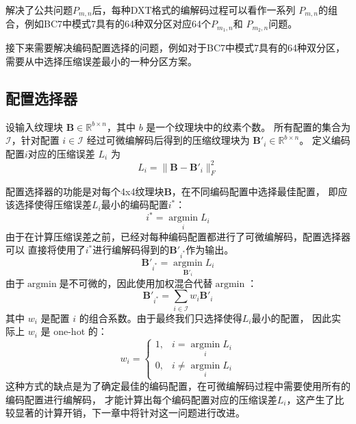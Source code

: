 解决了公共问题$P_{m,n}$后，每种DXT格式的编解码过程可以看作一系列
$P_{m,n}$的组合，例如BC7中模式7具有的64种双分区对应64个$P_{m_1,n}$和
$P_{m_2,n}$问题。

接下来需要解决编码配置选择的问题，例如对于BC7中模式7具有的64种双分区，
需要从中选择压缩误差最小的一种分区方案。

\subsection{配置选择器}

设输入纹理块 $\mathbf{B}\in\mathbb{R}^{b\times n}$，其中 $b$ 是一个纹理块中的纹素个数。
所有配置的集合为 $\mathcal{I}$，针对配置 $i\in\mathcal{I}$ 经过可微编解码后得到的压缩纹理块为 $\mathbf{B}'_i\in\mathbb{R}^{b\times n}$。
定义编码配置$i$对应的压缩误差 $L_i$ 为
\begin{equation}
L_i=\|\mathbf{B}-\mathbf{B}'_i\|_F^2
\end{equation}

配置选择器的功能是对每个4x4纹理块$\mathbf{B}$，在不同编码配置中选择最佳配置，
即应该选择使得压缩误差$L_i$最小的编码配置$i^*$：
\begin{equation}
    i^*=\mathop{\arg\min}\limits_{i} L_i
\end{equation}
由于在计算压缩误差之前，已经对每种编码配置都进行了可微编解码，配置选择器可以
直接将使用了$i^*$进行编解码得到的$\mathbf{B}'_{i^*}$作为输出。
\begin{equation}
    \mathbf{B}'_{i^*}=\mathop{\arg\min}\limits_{\mathbf{B}'_i} L_i
\end{equation}
由于$\mathop{\arg\min}$是不可微的，因此使用加权混合代替$\mathop{\arg\min}$：
\begin{equation}
\mathbf{B}'_{i^*}=\sum_{i\in\mathcal{I}} w_i\mathbf{B}'_i
\end{equation}
其中 $w_i$ 是配置 $i$ 的组合系数。由于最终我们只选择使得$L_i$最小的配置，
因此实际上 $w_i$ 是 one-hot 的：
\begin{equation}
    w_i =\left\{\begin{matrix}
        1,& i=\mathop{\arg\min}\limits_{i} L_i
        \\0,& i\ne\mathop{\arg\min}\limits_{i} L_i
        \end{matrix}\right.
\end{equation}
这种方式的缺点是为了确定最佳的编码配置，在可微编解码过程中需要使用所有的编码配置进行编解码，
才能计算出每个编码配置对应的压缩误差$L_i$，这产生了比较显著的计算开销，下一章中将针对这一问题进行改进。



